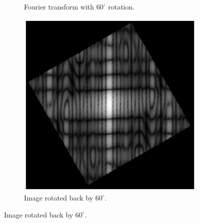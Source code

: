 \documentclass[11pt,a4paper]{article}
\begin{document}
\begin{itemize}
\begin{figure}[!ht]
\begin{subfigure}[t]{.32\linewidth}
		\caption{\scriptsize Fourier transform with $60^{\circ}$ rotation.}
		\label{fig:rotated60Fourier}
		\end{subfigure}
		\begin{subfigure}[t]{.32\linewidth} %
		\includegraphics[width=\columnwidth]{Rotation_G_60_Fourier_Back.eps}
		\caption{\scriptsize Image rotated back by $60^{\circ}$.}
		\label{fig:rotated60Back}
		\end{subfigure}
		

\end{figure}
\end{itemize}
\end{document}
